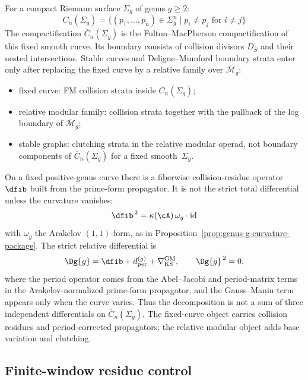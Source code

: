 \begin{definition}
For a compact Riemann surface $\Sigma_g$ of genus $g \geq 2$:
\[
C_n(\Sigma_g) = \{(p_1, \ldots, p_n) \in \Sigma_g^n \mid p_i \neq p_j \text{ for } i \neq j\}
\]
The compactification $\overline{C}_n(\Sigma_g)$ is the
Fulton--MacPherson compactification of this fixed smooth curve. Its
boundary consists of collision divisors $D_S$ and their nested
intersections. Stable curves and Deligne--Mumford boundary strata enter
only after replacing the fixed curve by a relative family over
$\overline{\mathcal M}_g$:
\begin{itemize}
\item fixed curve: FM collision strata inside $\overline{C}_n(\Sigma_g)$;
\item relative modular family: collision strata together with the
 pullback of the log boundary of $\overline{\mathcal M}_g$;
\item stable graphs: clutching strata in the relative modular operad,
 not boundary components of $\overline{C}_n(\Sigma_g)$ for a fixed
 smooth~$\Sigma_g$.
\end{itemize}
\end{definition}

\begin{remark}
\label{rem:period-integrals-bar}
On a fixed positive-genus curve there is a fiberwise collision-residue
operator $\dfib$ built from the prime-form propagator. It is not the
strict total differential unless the curvature vanishes:
\[
\dfib^{\,2}=\kappa(\cA)\,\omega_g\cdot\mathrm{id}
\]
with $\omega_g$ the Arakelov $(1,1)$-form, as in
Proposition~\ref{prop:genus-g-curvature-package}. The strict relative
differential is
\[
\Dg{g}=\dfib+d_{\mathrm{per}}^{(g)}
+\nabla_{\mathrm{KS}}^{\mathrm{GM}},
\qquad
\Dg{g}^{\,2}=0,
\]
where the period operator comes from the Abel--Jacobi and period-matrix
terms in the Arakelov-normalized prime-form propagator, and the
Gauss--Manin term appears only when the curve varies. Thus the
decomposition is not a sum of three independent differentials on
$\overline{C}_n(\Sigma_g)$. The fixed-curve object carries collision
residues and period-corrected propagators; the relative modular object
adds base variation and clutching.
\end{remark}

\subsection{Finite-window residue control}


